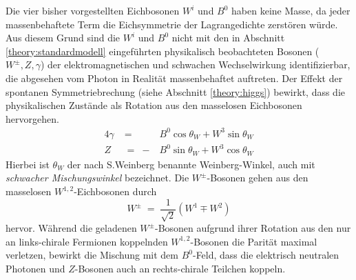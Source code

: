 Die vier bisher vorgestellten Eichbosonen $W^i$ und $B^0$ haben keine Masse, da
jeder massenbehaftete Term die Eichsymmetrie der Lagrangedichte zerstören
würde. Aus diesem Grund sind die $W^i$ und $B^0$ nicht mit den in Abschnitt
\ref{theory:standardmodell} eingeführten physikalisch beobachteten Bosonen
($W^\pm, Z, \gamma$) der elektromagnetischen und schwachen Wechselwirkung
identifizierbar, die abgesehen vom Photon in Realität massenbehaftet auftreten.
Der Effekt der spontanen Symmetriebrechung (siehe Abschnitt \ref{theory:higgs})
bewirkt, dass die physikalischen Zustände als Rotation aus den masselosen
Eichbosonen hervorgehen.
\begin{alignat}{4}
    \gamma &\;=\;  &B^0 \cos\theta_W + W^3\sin\theta_W \\
    Z      &\;=\; -&B^0 \sin\theta_W + W^3\cos\theta_W
\end{alignat}
Hierbei ist $\theta_W$ der nach S.Weinberg benannte Weinberg-Winkel, auch mit
\textit{schwacher Mischungswinkel} bezeichnet. Die $W^\pm$-Bosonen gehen aus den
masselosen $W^{1,2}$-Eichbosonen durch
\begin{equation}
    W^\pm \;=\; \frac{1}{\sqrt{2}} \left( W^1 \mp W^2 \right)
\end{equation}
hervor. Während die geladenen $W^\pm$-Bosonen aufgrund ihrer Rotation aus
den nur an links-chirale Fermionen koppelnden $W^{1,2}$-Bosonen die Parität
maximal verletzen, bewirkt die Mischung mit dem $B^0$-Feld, dass die elektrisch
neutralen Photonen und $Z$-Bosonen auch an rechts-chirale Teilchen koppeln.

